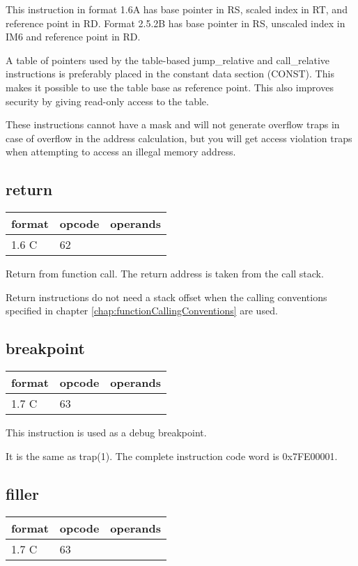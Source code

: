 \documentclass[forwardcom.tex]{subfiles}
\begin{document}
This instruction in format 1.6A has base pointer in RS, scaled index in RT, and reference point in RD. Format 2.5.2B has base pointer in RS, unscaled index in IM6 and reference point in RD.
\vv

A table of pointers used by the table-based jump\_relative and call\_relative instructions is preferably placed in the constant data section (CONST). This makes it possible to use the table base as reference point. This also improves security by giving read-only access to the table.
\vv

These instructions cannot have a mask and will not generate overflow traps in case of overflow in the address calculation, but you will get access violation traps when attempting to access an illegal memory address.
\vv


\subsection{return}
\label{table:returnInstruction}
\begin{tabular}{|p{14mm}|p{12mm}|p{110mm}|}
\hline
\bfseries format & \bfseries opcode & \bfseries operands \\ \hline
1.6 C & 62 & \\ \hline
\end{tabular}
\vv

Return from function call. The return address is taken from the call stack.
\vv

Return instructions do not need a stack offset when the calling conventions specified in chapter \ref{chap:functionCallingConventions} are used.


\subsection{breakpoint}
\label{table:breakpointInstruction}
\begin{tabular}{|p{12mm}|p{12mm}|p{110mm}|}
\hline
\bfseries format & \bfseries opcode & \bfseries operands \\ \hline
1.7 C & 63 & \\ \hline
\end{tabular}
\vv

This instruction is used as a debug breakpoint.
\vv

It is the same as trap(1). The complete instruction code word is 0x7FE00001.
\vv

\subsection{filler}
\label{table:fillerInstruction}
\begin{tabular}{|p{12mm}|p{15mm}|p{100mm}|}
\hline
\bfseries format & \bfseries opcode & \bfseries operands \\ \hline
1.7 C & 63 & \\ \hline
\end{tabular}
\vv
\end{document}
